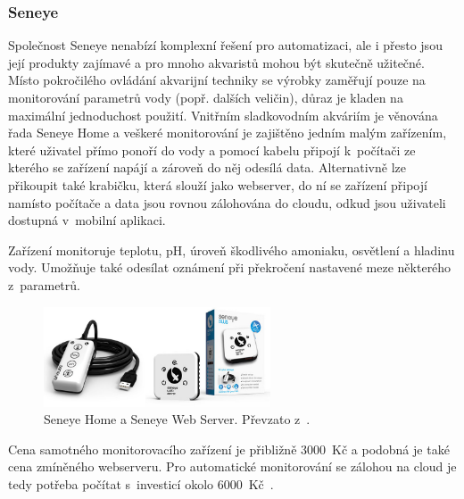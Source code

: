         \subsubsection{Seneye}
            Společnost Seneye nenabízí komplexní řešení pro automatizaci, ale i přesto jsou její produkty zajímavé a pro mnoho akvaristů mohou být skutečně užitečné. Místo pokročilého ovládání akvarijní techniky se výrobky zaměřují pouze na monitorování parametrů vody (popř. dalších veličin), důraz je kladen na maximální jednoduchost použití. Vnitřním sladkovodním akváriím je věnována řada Seneye Home a veškeré monitorování je zajištěno jedním malým zařízením, které uživatel přímo ponoří do vody a pomocí kabelu připojí k~počítači ze kterého se zařízení napájí a zároveň do něj odesílá data. Alternativně lze přikoupit také krabičku, která slouží jako webserver, do ní se zařízení připojí namísto počítače a data jsou rovnou zálohována do cloudu, odkud jsou uživateli dostupná v~mobilní aplikaci.

            Zařízení monitoruje teplotu, pH, úroveň škodlivého amoniaku, osvětlení a hladinu vody. Umožňuje také odesílat oznámení při překročení nastavené meze některého z~parametrů.

            \begin{figure}[h!]
                \centering
                \includegraphics[width=0.6\textwidth]{obrazky/trh/seneye-home.jpg}
                \caption{Seneye Home a Seneye Web Server. Převzato z~\cite{seneye-home}.}
                \label{fig:obrazky-trh-seneye-home-jpg}
            \end{figure}

            Cena samotného monitorovacího zařízení je přibližně \qty{3000}{Kč} a podobná je také cena zmíněného webserveru. Pro automatické monitorování se zálohou na cloud je tedy potřeba počítat s~investicí okolo \qty{6000}{Kč}~\cite{seneye-home}.
            


        